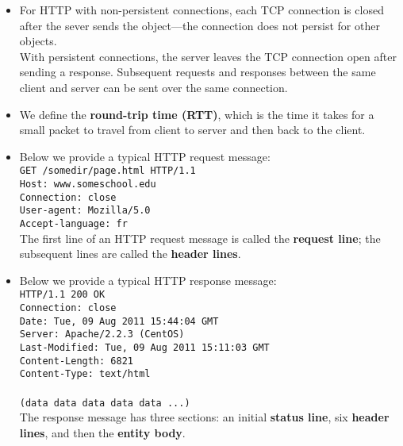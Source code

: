 \begin{itemize}
\item
For HTTP with non-persistent connections, each TCP connection is closed after the sever sends the object---the connection does not persist for other objects.\\
With persistent connections, the server leaves the TCP connection open after sending a response. Subsequent requests and responses between the same client and server can be sent over the same connection.

\item
We define the \textbf{round-trip time (RTT)}, which is the time it takes for a small packet to travel from client to server and then back to the client.

\item Below we provide a typical HTTP request message:\\
\hspace*{1em}\texttt{GET /somedir/page.html HTTP/1.1}\\
\hspace*{1em}\texttt{Host: www.someschool.edu}\\
\hspace*{1em}\texttt{Connection: close}\\
\hspace*{1em}\texttt{User-agent: Mozilla/5.0}\\
\hspace*{1em}\texttt{Accept-language: fr}\\
The first line of an HTTP request message is called the \textbf{request line}; the subsequent lines are called the \textbf{header lines}.

\item
Below we provide a typical HTTP response message:\\
\hspace*{1em}\texttt{HTTP/1.1 200 OK}\\
\hspace*{1em}\texttt{Connection: close}\\
\hspace*{1em}\texttt{Date: Tue, 09 Aug 2011 15:44:04 GMT}\\
\hspace*{1em}\texttt{Server: Apache/2.2.3 (CentOS)}\\
\hspace*{1em}\texttt{Last-Modified: Tue, 09 Aug 2011 15:11:03 GMT}\\
\hspace*{1em}\texttt{Content-Length: 6821}\\
\hspace*{1em}\texttt{Content-Type: text/html}\\
\hspace*{1em}\\
\hspace*{1em}\texttt{(data data data data data ...)}\\
The response message has three sections: an initial \textbf{status line}, six \textbf{header lines}, and then the \textbf{entity body}.


\end{itemize}
